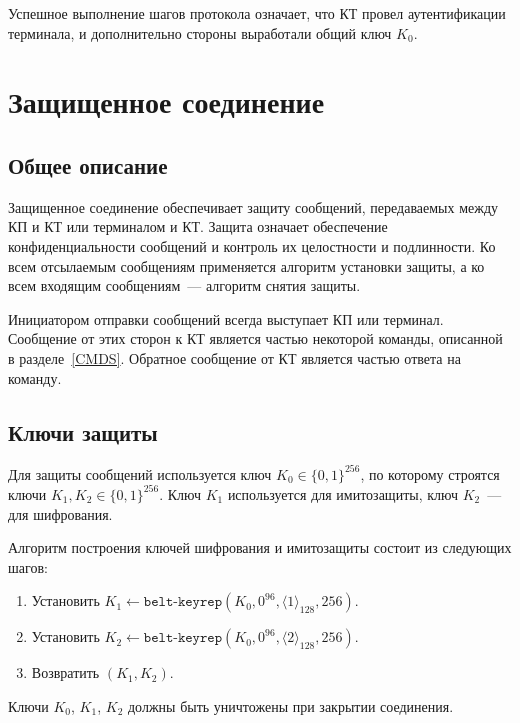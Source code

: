 Успешное выполнение шагов протокола означает, что КТ провел аутентификации 
терминала,  и дополнительно 
стороны выработали общий ключ $K_0$.

\section{Защищенное соединение}\label{CRYPTO.SM}

\subsection{Общее описание}

Защищенное соединение обеспечивает защиту сообщений, передаваемых между КП 
и КТ или терминалом и КТ. Защита означает обеспечение конфиденциальности сообщений 
и контроль их целостности и подлинности. Ко всем отсылаемым сообщениям 
применяется алгоритм установки защиты, а ко всем входящим сообщениям~--- 
алгоритм снятия защиты.

Инициатором отправки сообщений всегда выступает КП или терминал.
Сообщение от этих сторон к КТ является частью некоторой команды, 
описанной в разделе~\ref{CMDS}. 
Обратное сообщение от КТ является частью ответа на команду.

\subsection{Ключи защиты}

Для защиты сообщений используется ключ $K_0\in\{0,1\}^{256}$, по которому строятся 
ключи $K_1, K_2 \in\{0,1\}^{256}$. Ключ $K_1$ используется для имитозащиты, 
ключ $K_2$~--- для шифрования.

Алгоритм построения ключей шифрования и имитозащиты состоит из следующих шагов:

\begin{enumerate}
\item
Установить 
$K_1\gets\texttt{belt-keyrep}(K_0, 0^{96}, \langle 1 \rangle_{128}, 256)$.

\item
Установить 
$K_2\gets\texttt{belt-keyrep}(K_0, 0^{96}, \langle 2 \rangle_{128}, 256)$.

\item
Возвратить $(K_1, K_2)$.
\end{enumerate}

Ключи $K_0$, $K_1$, $K_2$ должны быть уничтожены при закрытии соединения.

